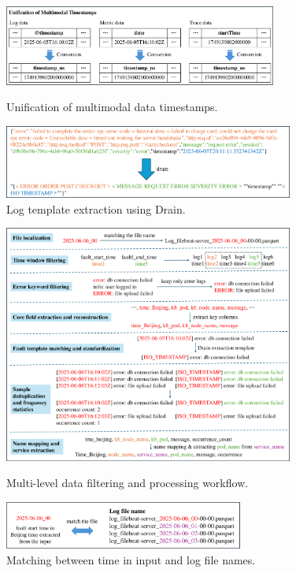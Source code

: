 \documentclass[10pt]{article}
\begin{document}
\begin{figure}[ht]
    \centering
    \includegraphics[width=0.8\textwidth]{fig4.pdf}
    \caption{Unification of multimodal data timestamps.}
    \label{fig4}

    \vspace{10pt}
    \includegraphics[width=0.85\textwidth]{fig5.pdf}
    \caption{Log template extraction using Drain.}
    \label{fig5}
\end{figure}

\begin{figure}[!t]
    \centering
    \includegraphics[width=0.85\textwidth]{fig6.pdf}
    \caption{Multi-level data filtering and processing workflow.}
    \label{fig6}

    \vspace{10pt}
    \includegraphics[width=0.7\textwidth]{fig7.pdf}
    \caption{Matching between time in input and log file names.}
    \label{fig7}
\end{figure}
\end{document}
